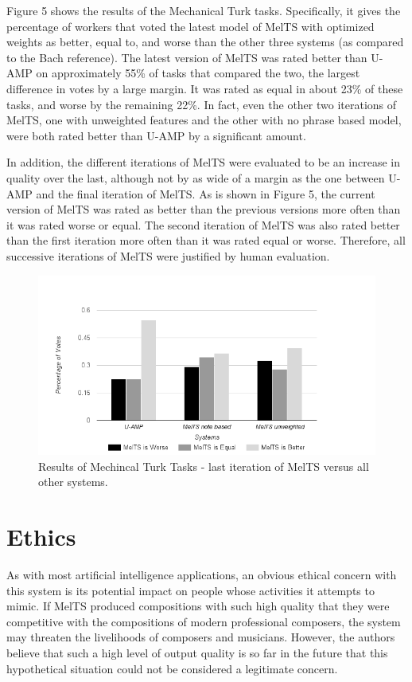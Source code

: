 \documentclass{sig-alternate}
\begin{document}
Figure 5 shows the results of the Mechanical Turk tasks. Specifically, it gives the percentage of workers that voted the latest model of MelTS with optimized weights as better, equal to, and worse than the other three systems (as compared to the Bach reference). The latest version of MelTS was rated better than U-AMP on approximately 55\% of tasks that compared the two, the largest difference in votes by a large margin. It was rated as equal in about 23\% of these tasks, and worse by the remaining 22\%. In fact, even the other two iterations of MelTS, one with unweighted features and the other with no phrase based model, were both rated better than U-AMP by a significant amount.

In addition, the different iterations of MelTS were evaluated to be an increase in quality over the last, although not by as wide of a margin as the one between U-AMP and the final iteration of MelTS. As is shown in Figure 5, the current version of MelTS was rated as better than the previous versions more often than it was rated worse or equal. The second iteration of MelTS was also rated better than the first iteration more often than it was rated equal or worse. Therefore, all successive iterations of MelTS were justified by human evaluation.

\begin{figure}
\includegraphics[scale=0.4]{images/mturk_results.png}
\caption{Results of Mechincal Turk Tasks - last iteration of MelTS versus all other systems.}
\end{figure}
\label{sec:system_performance}

\section{Ethics}
As with most artificial intelligence applications, an obvious ethical concern with this system is its potential impact on people whose activities it attempts to mimic. If MelTS produced compositions with such high quality that they were competitive with the compositions of modern professional composers, the system may threaten the livelihoods of composers and musicians. However, the authors believe that such a high level of output quality is so far in the future that this hypothetical situation could not be considered a legitimate concern.
\end{document}
